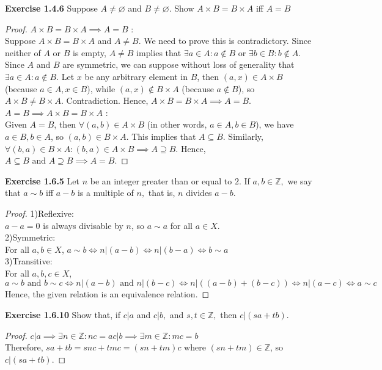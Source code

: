 \documentclass[12pt]{article}
\newcommand{\bbZ}{\mathbb{Z}}
\theoremstyle{definition}
\numberwithin{equation}{subsection}
\begin{document}
\textbf{Exercise 1.4.6} Suppose \(A \neq \varnothing\) and \(B \neq \varnothing .\) Show \(A \times B=B \times A\) iff \(A = B\)
\begin{proof}
\(A \times B=B \times A \implies A = B\) :\\
Suppose \(A \times B=B \times A\) and \(A \neq B\). We need to prove this is contradictory. Since neither of $A$ or $B$ is empty, $A \neq B$ implies that $\exists a \in A: a \notin B$ or $\exists b \in B: b \notin A$. Since $A$ and $B$ are symmetric, we can suppose without loss of generality that $\exists a \in A: a \notin B$. Let $x$ be any arbitrary element in $B$, then \((a, x) \in A \times B\) (because $a \in A, x \in B$), while \((a, x) \notin B \times A\) (because $a \notin B$), so $A \times B \neq B \times A$. Contradiction. Hence, \(A \times B=B \times A \implies A = B\).
\\
\(A = B \implies A \times B=B \times A\) :\\
Given $A = B$, then $\forall (a, b) \in A \times B$ (in other words, $a \in A, b \in B$), we have $a \in B, b \in A$, so $(a, b) \in B \times A$. This implies that $A \subseteq B$. Similarly, $\forall (b, a) \in B \times A: (b, a) \in A \times B \implies A \supseteq B$. Hence, $A \subseteq B \text{ and } A \supseteq B \implies A = B$.
\end{proof}

\textbf{Exercise 1.6.5} Let \(n\) be an integer greater than or equal to \(2 .\) If \(a, b \in \mathbb{Z},\)
we say that \(a \sim b\) iff \(a-b\) is a multiple of \(n,\) that is, \(n\) divides \(a-b\).
\begin{proof}
1)Reflexive:\\
$a - a = 0$ is always divisable by $n$, so $a \sim a$ for all $a \in X$.\\
2)Symmetric:\\
For all $a, b \in X$, $a \sim b \iff n | (a - b) \iff n | (b - a) \iff b \sim a$\\
3)Transitive:\\
For all $a, b, c  \in X$, $a \sim b \text{ and } b \sim c \iff n | (a-b) \text{ and } n | (b-c) \iff n|((a-b)+(b-c)) \iff n|(a-c) \iff a \sim c$\\
Hence, the given relation is an equivalence relation.
\end{proof}

\textbf{Exercise 1.6.10} Show that, if \(c | a\) and \(c | b,\) and \(s, t \in \mathbb{Z},\) then \(c |(s a+t b)\).
\begin{proof}
$c|a \implies \exists n \in \bbZ: nc=a$\qquad$c|b \implies \exists m \in \bbZ: mc=b$\\
Therefore, $sa+tb=snc+tmc=(sn+tm)c$ where $(sn+tm) \in \bbZ$, so $c|(sa+tb)$.
\end{proof}
\end{document}
